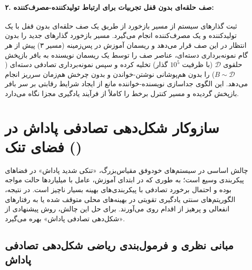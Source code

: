 \documentclass[oneside,openany,phd]{TMU-Thesis}
\begin{document}
\paragraph{۲. صف حلقه‌ای بدون قفل تجربیات برای ارتباط تولیدکننده-مصرف‌کننده:}
ثبت گذارهای سیستم از مسیر بازخورد از طریق یک صف حلقه‌ای بدون قفل با یک تولیدکننده و یک مصرف‌کننده انجام می‌گیرد. مسیر بازخورد گذارهای جدید را بدون انتظار در این صف قرار می‌دهد و ریسمان آموزش در پس‌زمینه (مسیر ۳) پیش از هر گام نمونه‌برداری دسته‌ای، عناصر صف را توسط یک ریسمان نویسنده به بافر بازپخش حلقوی $\mathcal{D}$ (با ظرفیت $10^5$ گذار) تخلیه کرده و سپس نمونه‌برداری تصادفی دسته‌ای ($B \sim \mathcal{D}$) را بدون هم‌پوشانی نوشتن-خواندن و بدون چرخش هم‌زمان سرریز انجام می‌دهد. این الگوی جداسازی نویسنده-خواننده مانع از ایجاد شرایط رقابتی بر سر بافر بازپخش گردیده و مسیر کنترل برخط را کاملاً از فرآیند یادگیری مجزا نگاه می‌دارد.

\section{سازوکار شکل‌دهی تصادفی پاداش در فضای تنک ()}
\label{sec:learning}

چالش اساسی در سیستم‌های خودوفق مقیاس‌بزرگ، «تنکی شدید پاداش» در فضاهای پیکربندی وسیع است؛ به طوری که در ابتدای آموزش، عامل با میلیاردها حالت مواجه بوده و احتمال برخورد تصادفی با پیکربندی‌های بهینه بسیار ناچیز است. در نتیجه، الگوریتم‌های سنتی یادگیری تقویتی در بهینه‌های محلی متوقف شده یا به رفتارهای انفعالی و پرهیز از اقدام روی می‌آورند. برای حل این چالش، روش پیشنهادی از «شکل‌دهی تصادفی پاداش» بهره می‌گیرد.

\subsection{مبانی نظری و فرمول‌بندی ریاضی شکل‌دهی تصادفی پاداش}
\label{subsec:theoretical_sparse_reward_shaping}
\end{document}
